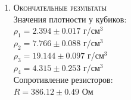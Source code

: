 \documentclass[12pt]{article}
\begin{document}
\begin{enumerate}
    
    \item \large\textsc{Окончательные результаты} \\
    	Значения плотности у кубиков: \\
		$\rho_1 = 2.394 \pm 0.017$ г/см$^3$\\
		$\rho_2 = 7.766 \pm 0.088$ г/см$^3$\\
		$\rho_3 = 19.144 \pm 0.097$ г/см$^3$\\
		$\rho_4 = 4.315 \pm 0.253$ г/см$^3$\\ 
		
		Сопротивление резисторов: \\
		$ R = 386.12 \pm 0.49 $ Ом
		
		


\end{enumerate}
\end{document}
